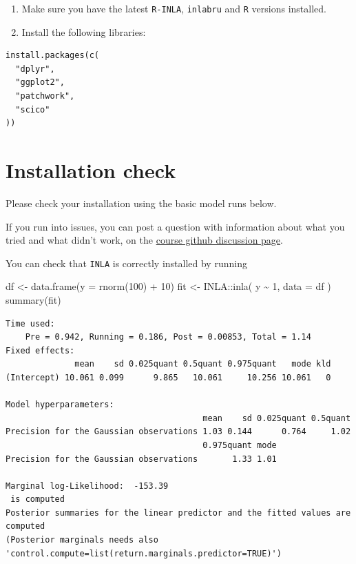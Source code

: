 \documentclass[
  letterpaper,
  DIV=11,
  numbers=noendperiod]{scrartcl}
\newenvironment{Shaded}{\begin{snugshade}}{\end{snugshade}}
\newcommand{\AttributeTok}[1]{\textcolor[rgb]{0.40,0.45,0.13}{#1}}
\newcommand{\DecValTok}[1]{\textcolor[rgb]{0.68,0.00,0.00}{#1}}
\newcommand{\FunctionTok}[1]{\textcolor[rgb]{0.28,0.35,0.67}{#1}}
\newcommand{\NormalTok}[1]{\textcolor[rgb]{0.00,0.23,0.31}{#1}}
\newcommand{\OtherTok}[1]{\textcolor[rgb]{0.00,0.23,0.31}{#1}}
\newcommand{\SpecialCharTok}[1]{\textcolor[rgb]{0.37,0.37,0.37}{#1}}
\begin{document}
\begin{enumerate}
\def\labelenumi{\arabic{enumi}.}
\setcounter{enumi}{2}
\item
  Make sure you have the latest \texttt{R-INLA}, \texttt{inlabru} and
  \texttt{R} versions installed.
\item
  Install the following libraries:
\end{enumerate}

\begin{verbatim}
install.packages(c(
  "dplyr",
  "ggplot2",
  "patchwork",
  "scico"
))
\end{verbatim}

\section{Installation check}\label{installation-check}

Please check your installation using the basic model runs below.

If you run into issues, you can post a question with information about
what you tried and what didn't work, on the
\href{https://github.com/smar-git/inlabru_newCaledonia/discussions}{course
github discussion page}.

You can check that \texttt{INLA} is correctly installed by running

\begin{Shaded}
\begin{Highlighting}[]
\NormalTok{df }\OtherTok{\textless{}{-}} \FunctionTok{data.frame}\NormalTok{(}\AttributeTok{y =} \FunctionTok{rnorm}\NormalTok{(}\DecValTok{100}\NormalTok{) }\SpecialCharTok{+} \DecValTok{10}\NormalTok{)}
\NormalTok{fit }\OtherTok{\textless{}{-}}\NormalTok{ INLA}\SpecialCharTok{::}\FunctionTok{inla}\NormalTok{(}
\NormalTok{  y }\SpecialCharTok{\textasciitilde{}} \DecValTok{1}\NormalTok{,}
  \AttributeTok{data =}\NormalTok{ df}
\NormalTok{)}
\FunctionTok{summary}\NormalTok{(fit)}
\end{Highlighting}
\end{Shaded}

\begin{verbatim}
Time used:
    Pre = 0.942, Running = 0.186, Post = 0.00853, Total = 1.14 
Fixed effects:
              mean    sd 0.025quant 0.5quant 0.975quant   mode kld
(Intercept) 10.061 0.099      9.865   10.061     10.256 10.061   0

Model hyperparameters:
                                        mean    sd 0.025quant 0.5quant
Precision for the Gaussian observations 1.03 0.144      0.764     1.02
                                        0.975quant mode
Precision for the Gaussian observations       1.33 1.01

Marginal log-Likelihood:  -153.39 
 is computed 
Posterior summaries for the linear predictor and the fitted values are computed
(Posterior marginals needs also 'control.compute=list(return.marginals.predictor=TRUE)')
\end{verbatim}
\end{document}
